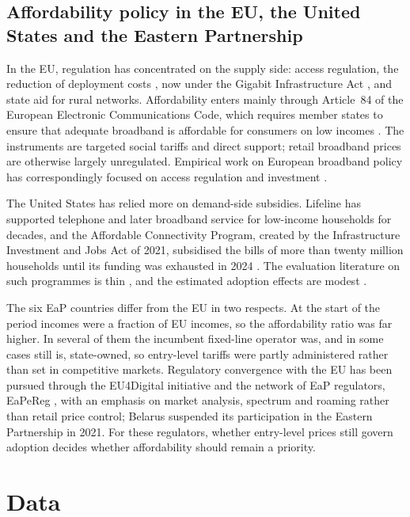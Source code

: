 \documentclass[pdflatex,sn-basic]{sn-jnl}
\begin{document}
\subsection{Affordability policy in the EU, the United States and the Eastern Partnership}

In the EU, regulation has concentrated on the supply side: access regulation, the reduction of deployment costs \citep{bcrd2014}, now under the Gigabit Infrastructure Act \citep{gia2024}, and state aid for rural networks. Affordability enters mainly through Article~84 of the European Electronic Communications Code, which requires member states to ensure that adequate broadband is affordable for consumers on low incomes \citep{eecc2018}. The instruments are targeted social tariffs and direct support; retail broadband prices are otherwise largely unregulated. Empirical work on European broadband policy has correspondingly focused on access regulation and investment \citep{briglauer2018speeding,wallsten2006broadband}.

The United States has relied more on demand-side subsidies. Lifeline has supported telephone and later broadband service for low-income households for decades, and the Affordable Connectivity Program, created by the Infrastructure Investment and Jobs Act of 2021, subsidised the bills of more than twenty million households until its funding was exhausted in 2024 \citep{fcc_acp}. The evaluation literature on such programmes is thin \citep{hauge2010demand}, and the estimated adoption effects are modest \citep{mendez2021lifeline}.

The six EaP countries differ from the EU in two respects. At the start of the period incomes were a fraction of EU incomes, so the affordability ratio was far higher. In several of them the incumbent fixed-line operator was, and in some cases still is, state-owned, so entry-level tariffs were partly administered rather than set in competitive markets. Regulatory convergence with the EU has been pursued through the EU4Digital initiative and the network of EaP regulators, EaPeReg \citep{eu4digital}, with an emphasis on market analysis, spectrum and roaming rather than retail price control; Belarus suspended its participation in the Eastern Partnership in 2021. For these regulators, whether entry-level prices still govern adoption decides whether affordability should remain a priority.

\section{Data}\label{sec:data}
\end{document}
